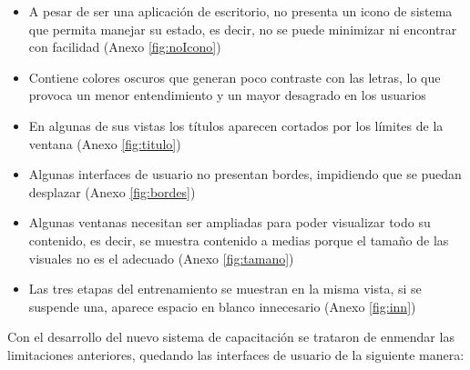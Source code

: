 \begin{itemize}
\item A pesar de ser una aplicación de escritorio, no presenta un icono de sistema que permita manejar su estado, es decir, no se puede minimizar ni encontrar con facilidad (Anexo \ref{fig:noIcono})
\item Contiene colores oscuros que generan poco contraste con las letras, lo que provoca un menor entendimiento y un mayor desagrado en los usuarios
\item En algunas de sus vistas los títulos aparecen cortados por los límites de la ventana (Anexo \ref{fig:titulo})
\item Algunas interfaces de usuario no presentan bordes, impidiendo que se puedan desplazar (Anexo \ref{fig:bordes})
\item Algunas ventanas necesitan ser ampliadas para poder visualizar todo su contenido, es decir, se muestra contenido a medias porque el tamaño de las visuales no es el adecuado (Anexo \ref{fig:tamano})
\item Las tres etapas del entrenamiento se muestran en la misma vista, si se suspende una, aparece espacio en blanco innecesario (Anexo \ref{fig:inn})
\end{itemize}

Con el desarrollo del nuevo sistema de capacitación se trataron de enmendar las limitaciones anteriores, quedando las interfaces de usuario de la siguiente manera:

